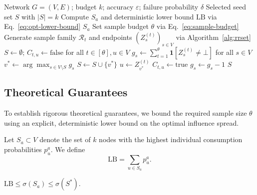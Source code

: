 \documentclass[sigconf]{acmart}
\newcommand{\CIMRIS}{\textsc{CIM-RIS}}
\begin{document}
\begin{algorithm}[t]
\caption{\CIMRIS{}: Scalable Seed Selection for CIM}
\label{alg:cim-ris}
\begin{algorithmic}[1]
\Require Network $G=(V,E)$; budget $k$; accuracy $\varepsilon$; failure probability $\delta$
\Ensure Selected seed set $S$ with $|S|=k$
\State Compute $S_a$ and deterministic lower bound $\mathrm{LB}$ via Eq.~\eqref{eq:opt-lower-bound}
  \State \Return $S_a$ 
\EndIf
\State Set sample budget $\theta$ via Eq.~\eqref{eq:sample-budget}
  \State Generate sample family $\mathcal{R}_t$ and endpoints $(Z_s^{(t)})_{s\in V}$ via Algorithm~\ref{alg:rrset}
\EndFor
\State $S \gets \emptyset$; $C_{t,u} \gets \mathrm{false}$ for all $t\in[\theta], u\in V$
\State $g_s \gets \sum_{t=1}^{\theta}\mathbf{1}[Z_s^{(t)} \ne \bot]$ for all $s \in V$
  \State $v^* \gets \arg\max_{s\in V\setminus S} g_s$
  \State $S \gets S \cup \{v^*\}$
    \State $u \gets Z_{v^*}^{(t)}$
      \State $C_{t,u} \gets \mathrm{true}$
        \State $g_s \gets g_s - 1$ 
      \EndFor
    \EndIf
  \EndFor
\EndFor
\State \Return $S$
\end{algorithmic}
\end{algorithm}

\subsection{Theoretical Guarantees}
\label{sec:theoretical-guarantees}

To establish rigorous theoretical guarantees, we bound the required sample
size $\theta$ using an explicit, deterministic lower bound on the optimal
influence spread.

\begin{definition}
Let $S_a \subset V$ denote the set of $k$ nodes with the highest individual
consumption probabilities $p_u^a$.
We define
\begin{equation}
\label{eq:opt-lower-bound}
  \mathrm{LB} = \sum_{u\in S_a} p_u^a.
\end{equation}
\end{definition}

\begin{lemma}
\label{lem:lower-bound}
$\mathrm{LB} \le \sigma(S_a) \le \sigma(S^*)$.
\end{lemma}
\end{document}
